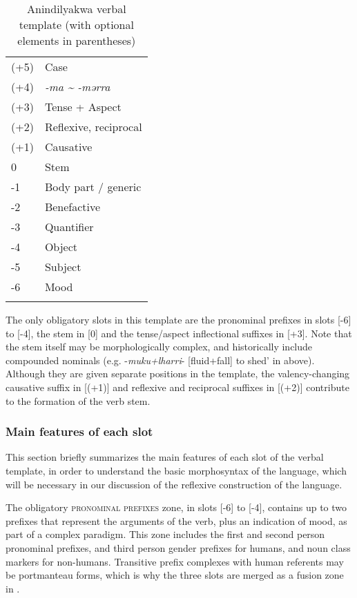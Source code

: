 \documentclass[output=paper]{langscibook}
\begin{document}
\begin{table}
\begin{tabularx}{0.4\textwidth}{XX}
\lsptoprule
(+5) & Case\\
(+4) & \textit{-ma {\textasciitilde} -mərra}\\
(+3) & Tense + Aspect\\
(+2) & Reflexive, reciprocal\\
(+1) & Causative\\
0 & Stem\\
-1 & Body part / generic\\
-2 & Benefactive\\
-3 & Quantifier\\
-4 & Object\\
-5 & Subject\\
-6 & Mood\\
\lspbottomrule
\end{tabularx}
\caption{Anindilyakwa verbal template (with optional elements in parentheses)}
\label{tab:vanegmond:3}
\end{table}


The only obligatory slots in this template are the pronominal prefixes in slots [-6] to [-4], the stem in [0] and the tense/aspect inflectional suffixes in [+3]. Note that the stem itself may be morphologically complex, and historically include compounded nominals (e.g. -\textit{muku+lharri}- [fluid+fall] to shed’ in  above). Although they are given separate positions in the template, the valency-changing causative suffix in [(+1)] and reflexive and reciprocal suffixes in [(+2)] contribute to the formation of the verb stem.



\subsubsection{Main features of each slot}\label{sec:vanegmond:2.3.1}



This section briefly summarizes the main features of each slot of the verbal template, in order to understand the basic morphosyntax of the language, which will be necessary in our discussion of the reflexive construction of the language.



 The obligatory \textsc{pronominal} \textsc{prefixes} zone, in slots [-6] to [-4], contains up to two prefixes that represent the arguments of the verb, plus an indication of mood, as part of a complex paradigm. This zone includes the first and second person pronominal prefixes, and third person gender prefixes for humans, and noun class markers for non-humans. Transitive prefix complexes with human referents may be portmanteau forms, which is why the three slots are merged as a fusion zone in .
\end{document}
